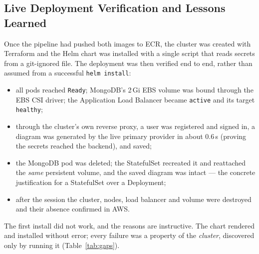 \documentclass[11pt,a4paper]{article}
\begin{document}
\subsection{Live Deployment Verification and Lessons Learned}
\label{sec:liveverify}
Once the pipeline had pushed both images to ECR, the cluster was created with
Terraform and the Helm chart was installed with a single script that reads
secrets from a git-ignored file. The deployment was then verified end to end,
rather than assumed from a successful \texttt{helm install}:
\begin{itemize}[nosep]
    \item all pods reached \texttt{Ready}; MongoDB's 2\,Gi EBS volume was
        bound through the EBS CSI driver; the Application Load Balancer
        became \texttt{active} and its target \texttt{healthy};
    \item through the cluster's own reverse proxy, a user was registered and
        signed in, a diagram was generated by the live primary provider in
        about 0.6\,s (proving the secrets reached the backend), and saved;
    \item the MongoDB pod was deleted; the StatefulSet recreated it and
        reattached the \emph{same} persistent volume, and the saved diagram
        was intact --- the concrete justification for a StatefulSet over a
        Deployment;
    \item after the session the cluster, nodes, load balancer and volume were
        destroyed and their absence confirmed in AWS.
\end{itemize}

The first install did not work, and the reasons are instructive. The chart
rendered and installed without error; every failure was a property of the
\emph{cluster}, discovered only by running it (Table~\ref{tab:gaps}).
\end{document}
